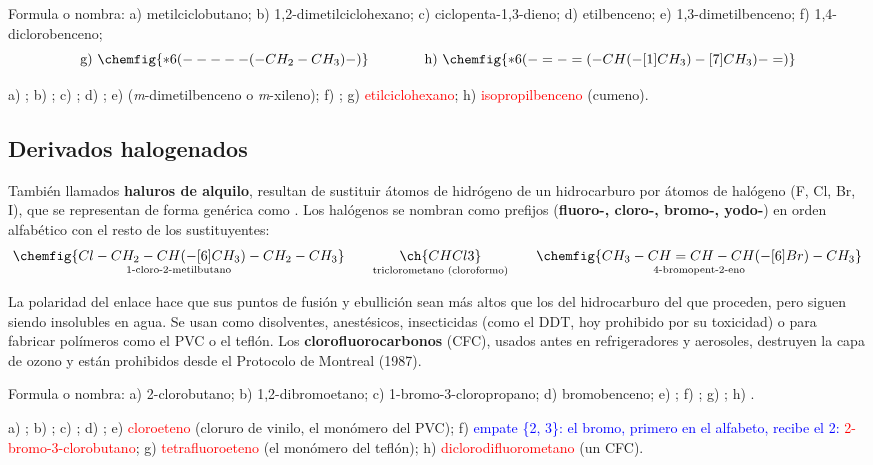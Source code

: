 \begin{exercise}
    Formula o nombra: a) metilciclobutano; b) 1,2-dimetilciclohexano; c) ciclopenta-1,3-dieno; d) etilbenceno; e)
    1,3-dimetilbenceno; f) 1,4-diclorobenceno;
    \[ \text{g)}\ \chemfig{*6(-----(-CH_2-CH_3)-)} \qquad\qquad \text{h)}\ \chemfig{*6(-=-=(-CH(-[1]CH_3)-[7]CH_3)-=)} \]
    \begin{solu}
        a) \textcolor{red}{}; b) \textcolor{red}{};
        c) \textcolor{red}{}; d) \textcolor{red}{};
        e) \textcolor{red}{} (\emph{m}-dimetilbenceno o \emph{m}-xileno);
        f) \textcolor{red}{}; g) \textcolor{red}{etilciclohexano}; h) \textcolor{red}{isopropilbenceno}
        (cumeno).
    \end{solu}
\end{exercise}

\subsection{Derivados halogenados}

También llamados \textbf{haluros de alquilo}, resultan de sustituir átomos de hidrógeno de un hidrocarburo por átomos de halógeno
(F, Cl, Br, I), que se representan de forma genérica como . Los halógenos se nombran como prefijos (\textbf{fluoro-,
cloro-, bromo-, yodo-}) en orden alfabético con el resto de los sustituyentes:
\[ \underset{\text{1-cloro-2-metilbutano}}{\chemfig{Cl-CH_2-CH(-[6]CH_3)-CH_2-CH_3}} \qquad
   \underset{\text{triclorometano (cloroformo)}}{\ch{CHCl3}} \qquad
   \underset{\text{4-bromopent-2-eno}}{\chemfig{CH_3-CH=CH-CH(-[6]Br)-CH_3}} \]

La polaridad del enlace  hace que sus puntos de fusión y ebullición sean más altos que los del hidrocarburo del que
proceden, pero siguen siendo insolubles en agua. Se usan como disolventes, anestésicos, insecticidas (como el DDT, hoy prohibido por
su toxicidad) o para fabricar polímeros como el PVC o el teflón. Los \textbf{clorofluorocarbonos} (CFC), usados antes en
refrigeradores y aerosoles, destruyen la capa de ozono y están prohibidos desde el Protocolo de Montreal (1987).

\begin{exercise}
    Formula o nombra: a) 2-clorobutano; b) 1,2-dibromoetano; c) 1-bromo-3-cloropropano; d) bromobenceno; e) ;
    f) ; g) ; h) .
    \begin{solu}
        a) \textcolor{red}{}; b) \textcolor{red}{}; c) \textcolor{red}{};
        d) \textcolor{red}{}; e) \textcolor{red}{cloroeteno} (cloruro de vinilo, el monómero del PVC);
        f) \textcolor{blue}{empate \{2, 3\}: el bromo, primero en el alfabeto, recibe el 2:} \textcolor{red}{2-bromo-3-clorobutano};
        g) \textcolor{red}{tetrafluoroeteno} (el monómero del teflón); h) \textcolor{red}{diclorodifluorometano} (un CFC).
    \end{solu}
\end{exercise}

